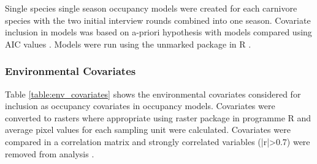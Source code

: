 Single species single season occupancy models were created for each carnivore species with the two initial interview rounds combined into one season. Covariate inclusion in models was based on a-priori hypothesis with models compared using AIC values \cite{burnham2002}. Models were run using the unmarked package \cite{Fiske2011} in R \cite{RCoreTeam2015}.\\

\subsubsection{Environmental Covariates}
Table \ref{table:env_covariates} shows the environmental covariates considered for inclusion as occupancy covariates in occupancy models. Covariates were converted to rasters where appropriate using raster package \cite{Hijmans2014} in programme R \cite{RCoreTeam2015} and average pixel values for each sampling unit were calculated. Covariates were compared in a correlation matrix and strongly correlated variables (|r|>0.7) were removed from analysis \cite{Dormann_2012}.

